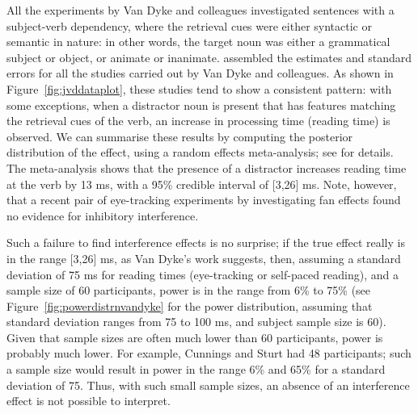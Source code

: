 \documentclass{cambridge7A}\usepackage[]{graphicx}\usepackage[]{color}
\begin{document}
All the experiments by Van Dyke and colleagues investigated sentences with a subject-verb dependency, where the retrieval cues were either syntactic or semantic in nature:  in other words, the target noun was either a grammatical subject or object,  or animate or inanimate. \cite{JaegerEngelmannVasishth2017} assembled the estimates and standard errors for all the studies carried out by Van Dyke and colleagues. As shown in Figure~\ref{fig:jvddataplot}, these studies tend to show a consistent pattern: with some exceptions, when a distractor noun is present that has features matching the retrieval cues of the verb, an increase in processing time (reading time) is observed. 
We can summarise these results by computing the posterior distribution of the effect, using a random effects  meta-analysis; see \cite{JaegerEngelmannVasishth2017} for details. The meta-analysis shows that the presence of a distractor increases reading time at the verb by 13 ms, with a 95\% credible interval of [3,26] ms. Note, however, that a recent pair of eye-tracking experiments by \cite{CunningsSturt2018} investigating fan effects found no evidence  for inhibitory interference.  

Such a failure to find interference effects is no surprise; if the true effect really is in the range [3,26] ms, as Van Dyke's work suggests, then, assuming a standard deviation of 75 ms for reading times (eye-tracking or self-paced reading), and a sample size of 60 participants, power is in the range from 6\% to 75\% (see Figure~\ref{fig:powerdistrnvandyke} for the power distribution, assuming that standard deviation ranges from 75 to 100 ms, and subject sample size is 60). Given that sample sizes are often much lower than 60 participants, power is probably much lower. 
For example, Cunnings and Sturt had 48 participants; such a sample size would result in  power in the range 6\% and 65\% for a standard deviation of 75.
Thus, with such small sample sizes, an absence of an interference effect is not possible to interpret.
\end{document}

